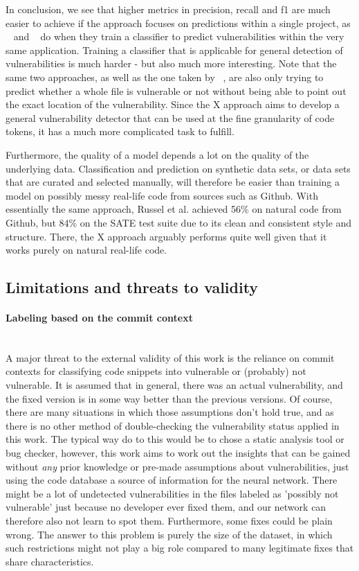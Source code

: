 \documentclass[
	a4paper,
	pagesize,
	pdftex,
	12pt,
	twoside, %
	BCOR=5mm, %
	ngerman,
	fleqn,
	final,
	]{scrartcl}
\begin{document}
In conclusion, we see that higher metrics in precision, recall and f1 are much easier to achieve if the approach focuses on predictions within a single project, as ~\cite{Hovsepyan.2012} and ~\cite{Dam.2017} do when they train a classifier to predict vulnerabilities within the very same application. Training a classifier that is applicable for general detection of vulnerabilities is much harder - but also much more interesting. Note that the same two approaches, as well as the one taken by  ~\cite{Pang.2015}, are also only trying to predict whether a whole file is vulnerable or not without being able to point out the exact location of the vulnerability. Since the X approach aims to develop a general vulnerability detector that can be used at the fine granularity of code tokens, it has a much more complicated task to fulfill.

Furthermore, the quality of a model depends a lot on the quality of the underlying data. Classification and prediction on synthetic data sets, or data sets that are curated and selected manually, will therefore be easier than training a model on possibly messy real-life code from sources such as Github. With essentially the same approach, Russel et al. achieved 56\% on natural code from Github, but 84\% on the SATE test suite due to its clean and consistent style and structure. There, the X approach arguably performs quite well given that it works purely on natural real-life code. 







\subsection{Limitations and threats to validity}

\paragraph{Labeling based on the commit context}\mbox{}\\
A major threat to the external validity of this work is the reliance on commit contexts for classifying code snippets into vulnerable or (probably) not vulnerable. It is assumed that in general, there was an actual vulnerability, and the fixed version is in some way better than the previous versions. Of course, there are many situations in which those assumptions don't hold true, and as there is no other method of double-checking the vulnerability status applied in this work. The typical way do to this would be to chose a static analysis tool or bug checker, however, this work aims to work out the insights that can be gained without \textit{any} prior knowledge or pre-made assumptions about vulnerabilities, just using the code database a source of information for the neural network. There might be a lot of undetected vulnerabilities in the files labeled as 'possibly not vulnerable' just because no developer ever fixed them, and our network can therefore also not learn to spot them. Furthermore, some fixes could be plain wrong. The answer to this problem is purely the size of the dataset, in which such restrictions might not play a big role compared to many legitimate fixes that share characteristics.
\end{document}
